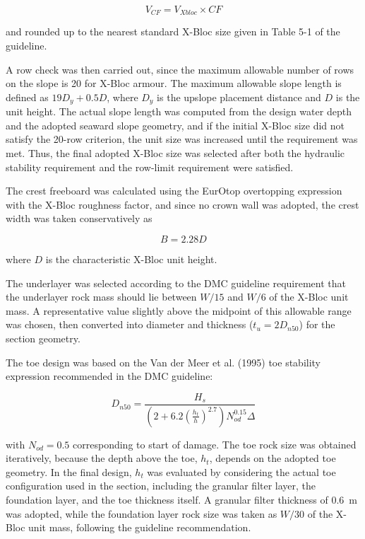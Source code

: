 \documentclass[a4paper, 11pt]{article}
\begin{document}
\begin{equation}
    V_{CF}=V_{Xbloc}\times CF
\end{equation}

and rounded up to the nearest standard X-Bloc size given in Table 5-1 of the guideline.

A row check was then carried out, since the maximum allowable number of rows on the slope is 20 for X-Bloc armour. The maximum allowable slope length is defined as $19D_y+0.5D$, where $D_y$ is the upslope placement distance and $D$ is the unit height. The actual slope length was computed from the design water depth and the adopted seaward slope geometry, and if the initial X-Bloc size did not satisfy the 20-row criterion, the unit size was increased until the requirement was met. Thus, the final adopted X-Bloc size was selected after both the hydraulic stability requirement and the row-limit requirement were satisfied.

The crest freeboard was calculated using the EurOtop overtopping expression with the X-Bloc roughness factor, and since no crown wall was adopted, the crest width was taken conservatively as

\begin{equation}
    B = 2.28D
\end{equation}

where $D$ is the characteristic X-Bloc unit height.

The underlayer was selected according to the DMC guideline requirement that the underlayer rock mass should lie between $W/15$ and $W/6$ of the X-Bloc unit mass. A representative value slightly above the midpoint of this allowable range was chosen, then converted into diameter and thickness ($t_u = 2D_{n50}$) for the section geometry.

The toe design was based on the Van der Meer et al. (1995) toe stability expression recommended in the DMC guideline:

\begin{equation}
    D_{n50}=\frac{H_s}
    {\left(2+6.2\left(\frac{h_t}{h}\right)^{2.7}\right)N_{od}^{0.15}\Delta}
\end{equation}

with $N_{od}=0.5$ corresponding to start of damage. The toe rock size was obtained iteratively, because the depth above the toe, $h_t$, depends on the adopted toe geometry. In the final design, $h_t$ was evaluated by considering the actual toe configuration used in the section, including the granular filter layer, the foundation layer, and the toe thickness itself. A granular filter thickness of 0.6~m was adopted, while the foundation layer rock size was taken as $W/30$ of the X-Bloc unit mass, following the guideline recommendation.
\end{document}
